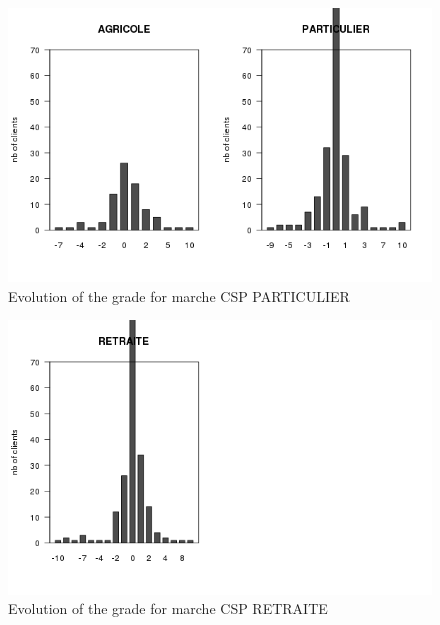 \documentclass[a4paper, 11pt]{article}
\begin{document}
        \begin{figure}[!ht]
                \centering
                \includegraphics[height = 10 cm]{Remi/Evolution_of_the_grade_for_marche_CSP_PARTICULIER.png}
                \caption{Evolution of the grade for marche CSP PARTICULIER}
                \label{fig:e_CSP_PARTICULIER}
        \end{figure}

        \begin{figure}[!ht]
                \centering
                \includegraphics[height = 10 cm]{Remi/Evolution_of_the_grade_for_marche_CSP_RETRAITE.png}
                \caption{Evolution of the grade for marche CSP RETRAITE}
                \label{fig:e_CSP_RETRAITE}
        \end{figure}
\end{document}
